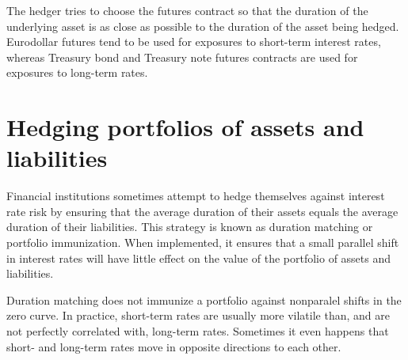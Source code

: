 \documentclass{article}
\begin{document}
The hedger tries to choose the futures contract so that the duration of the underlying asset is as close as possible to the duration of the asset being hedged. Eurodollar futures tend to be used for exposures to short-term interest rates, whereas Treasury bond and Treasury note futures contracts are used for exposures to long-term rates.

\section{Hedging portfolios of assets and liabilities}
Financial institutions sometimes attempt to hedge themselves against interest rate risk by ensuring that the average duration of their assets equals the average duration of their liabilities. This strategy is known as duration matching or portfolio immunization. When implemented, it ensures that a small parallel shift in interest rates will have little effect on the value of the portfolio of assets and liabilities.

Duration matching does not immunize a portfolio against nonparalel shifts in the zero curve. In practice, short-term rates are usually more vilatile than, and are not perfectly correlated with, long-term rates. Sometimes it even happens that short- and long-term rates move in opposite directions to each other.
\end{document}
